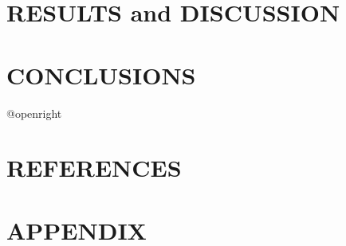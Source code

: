 \documentclass[14pt]{extarticle}
\makeatletter
\newcommand\backmatter{
    \if @openright
        \cleardoublepage
    \else
        \clearpage
    \fi
}
\makeatother
\begin{document}
\section{RESULTS and DISCUSSION}
\lipsum

\newpage
\section{CONCLUSIONS}
\lipsum

\backmatter

\newpage
{}
\section*{REFERENCES}
\lipsum[10]

\newpage
{}
\section*{APPENDIX}
\lipsum[10]
\end{document}
